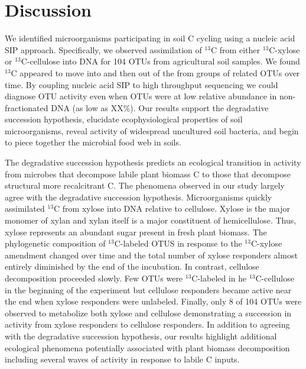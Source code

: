 \section{Discussion} 
We identified microorganisms participating in soil C cycling using a nucleic
acid SIP approach. Specifically, we observed assimilation of $^{13}$C from
either $^{13}$C-xylose or $^{13}$C-cellulose into DNA for 104 OTUs from
agricultural soil samples. We found $^{13}$C appeared to move into and then out
of the from groups of related OTUs over time. By coupling nucleic acid SIP to
high throughput sequencing we could diagnose OTU activity even when OTUs were
at low relative abundance in non-fractionated DNA (as low as XX\%). Our results
support the degradative succession hypothesis, elucidate ecophysiological
properties of soil microorganisms, reveal activity of widespread uncultured
soil bacteria, and begin to piece together the microbial food web in soils. 

The degradative succession hypothesis predicts an ecological transition in
activity from microbes that decompose labile plant biomass C to those that
decompose structural more recalcitrant C. The phenomena observed in our study
largely agree with the degradative succession hypothesis. Microorganisms
quickly assimilated $^{13}$C from xylose into DNA relative to cellulose. Xylose
is the major monomer of xylan and xylan itself is a major constituent of
hemicellulose. Thus, xylose represents an abundant sugar present in fresh plant
biomass. The phylogenetic composition of $^{13}$C-labeled OTUS in response to
the $^{13}$C-xylose amendment changed over time and the total number of xylose
responders almost entirely diminished by the end of the incubation. In
contrast, cellulose decomposition proceeded slowly. Few OTUs were
$^{13}$C-labeled in he $^{13}$C-cellulose in the beginning of the experiment
but cellulose responders became active near the end when xylose responders were
unlabeled. Finally, only 8 of 104 OTUs were observed to metabolize both xylose
and cellulose demonstrating a succession in activity from xylose responders to
cellulose responders. In addition to agreeing with the degradative succession
hypothesis, our results highlight additional ecological phenomena potentially
associated with plant biomass decomposition including several waves of activity
in response to labile C inputs.  

